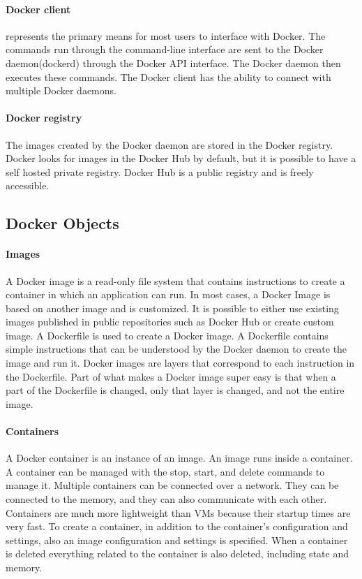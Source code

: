		\paragraph{Docker client} represents the primary means for most users to interface with Docker. The commands run through the command-line interface are sent to the Docker daemon(dockerd) through the Docker API interface. The Docker daemon then executes these commands. The Docker client has the ability to connect with multiple Docker daemons.\cite[P.~32]{Kinnary2018}
		
		\paragraph{Docker registry} The images created by the Docker daemon are stored in the Docker registry. Docker looks for images in the Docker Hub by default, but it is possible to have a self hosted private registry. Docker Hub is a public registry and is freely accessible.\cite[P.~33]{Kinnary2018}
			
		\subsection{Docker Objects}
		\label{Grundlagen:Docker:Docker Objects}
		\paragraph{Images}
		A Docker image is a read-only file system that contains instructions to create a container in which an application can run. In most cases, a Docker Image is based on another image and is customized. It is possible to either use existing images published in public repositories such as Docker Hub or create custom image.
		A Dockerfile is used to create a Docker image. A Dockerfile contains simple instructions that can be understood by the Docker daemon to	create the image and run it. Docker images are layers that correspond to each instruction in the Dockerfile. Part of what makes a Docker image super easy is that when a part of the Dockerfile is changed, only that layer is changed, and not the entire image.\cite[P.~34]{Kinnary2018}

		\paragraph{Containers}
		A Docker container is an instance of an image. An image runs inside a container. A container can be managed with the stop, start, and delete commands to manage it. Multiple containers can be connected over a network. They can be connected to the memory, and they can also communicate with each other. Containers are much more lightweight than VMs because their startup times are very fast. To create a container, in addition to the container's configuration and settings,  also an image configuration and settings is specified. When a container is deleted everything related to the container is also deleted, including state and memory.\cite[P.~34]{Kinnary2018}

